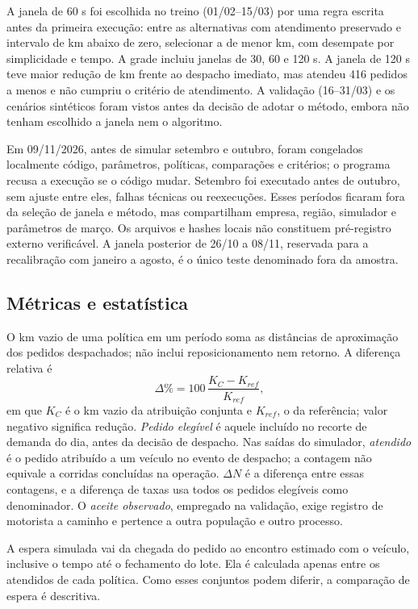 A janela de 60 s foi escolhida no treino (01/02--15/03) por uma regra escrita antes da primeira execução: entre as alternativas com atendimento preservado e intervalo de km abaixo de zero, selecionar a de menor km, com desempate por simplicidade e tempo. A grade incluiu janelas de 30, 60 e 120 s. A janela de 120 s teve maior redução de km frente ao despacho imediato, mas atendeu 416 pedidos a menos e não cumpriu o critério de atendimento. A validação (16--31/03) e os cenários sintéticos foram vistos antes da decisão de adotar o método, embora não tenham escolhido a janela nem o algoritmo.

Em 09/11/2026, antes de simular setembro e outubro, foram congelados localmente código, parâmetros, políticas, comparações e critérios; o programa recusa a execução se o código mudar. Setembro foi executado antes de outubro, sem ajuste entre eles, falhas técnicas ou reexecuções. Esses períodos ficaram fora da seleção de janela e método, mas compartilham empresa, região, simulador e parâmetros de março. Os arquivos e hashes locais não constituem pré-registro externo verificável. A janela posterior de 26/10 a 08/11, reservada para a recalibração com janeiro a agosto, é o único teste denominado fora da amostra.

\subsection{Métricas e estatística}

O km vazio de uma política em um período soma as distâncias de aproximação dos pedidos despachados; não inclui reposicionamento nem retorno. A diferença relativa é
\begin{equation}
\Delta\% = 100\,\frac{K_C-K_{ref}}{K_{ref}}, \label{eq:delta}
\end{equation}
em que $K_C$ é o km vazio da atribuição conjunta e $K_{ref}$, o da referência; valor negativo significa redução. \emph{Pedido elegível} é aquele incluído no recorte de demanda do dia, antes da decisão de despacho. Nas saídas do simulador, \emph{atendido} é o pedido atribuído a um veículo no evento de despacho; a contagem não equivale a corridas concluídas na operação. $\Delta N$ é a diferença entre essas contagens, e a diferença de taxas usa todos os pedidos elegíveis como denominador. O \emph{aceite observado}, empregado na validação, exige registro de motorista a caminho e pertence a outra população e outro processo.

A espera simulada vai da chegada do pedido ao encontro estimado com o veículo, inclusive o tempo até o fechamento do lote. Ela é calculada apenas entre os atendidos de cada política. Como esses conjuntos podem diferir, a comparação de espera é descritiva.

